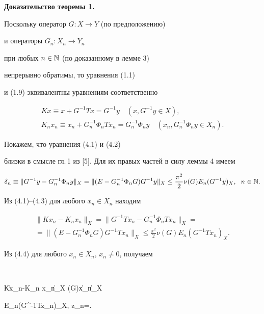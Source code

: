 {\bf Доказательство теоремы 1.}


Поскольку оператор $G:X \to Y$ (по предположению) 


и операторы $G_n :X_n \to Y_n$


при любых $n \in\Bbb N$ (по доказанному в лемме 3) 


непрерывно обратимы, то уравнения (1.1)


и (1.9) эквивалентны уравнениям соответственно


\begin{gather}


Kx \equiv x+G^{-1}Tx=G^{-1}y \quad (x, G^{-1}y \in X), \\


K_n x_n \equiv x_n+G_{n}^{-1}\Phi_{n}Tx_{n}=G_{n}^{-1}\Phi_{n}y \quad (x_n,


G_{n}^{-1}\Phi_n y \in X_n).


\end{gather}


Покажем, что уравнения (4.1) и (4.2)


близки в смысле гл.\,1 из [5]. Для их правых частей в силу леммы 4 имеем


\begin{equation}


\delta_n \equiv \|G^{-1}y-G^{-1}_n\Phi_n y\|_X=


\|(E-G^{-1}_n\Phi_n G)G^{-1}y\|_X \le


\frac{\pi^2}{2}\nu(G)E_n(G^{-1}y)_X,\ \; n \in \N.


\end{equation}


Из (4.1)--(4.3) для любого $x_n \in X_n$ находим


\begin{multline}


\|Kx_n-K_n x_n\|_X=\|G^{-1}Tx_n-G^{-1}_n\Phi_n Tx_n\|_X= \\


=\|(E-G^{-1}_n\Phi_nG)G^{-1}Tx_n\|_X \le


\frac{\pi^2}{2}\nu(G)E_n(G^{-1}Tx_n)_X.


\end{multline}


Из (4.4) для любого $x_n \in X_n$, $x_n \ne 0$, получаем


$$


\|Kx_n-K_n x_n\|_X \le {}\nu(G)\|x_n\|_X \,


E_n(G^{-1}Tz_n)_X, \quad z_n=.


